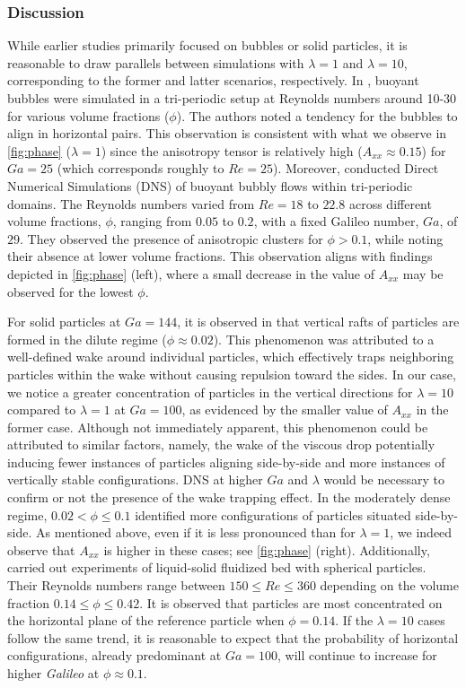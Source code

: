 \documentclass[11pt]{My_preprint}
\begin{document}
\subsubsection*{Discussion}
While earlier studies primarily focused on bubbles or solid particles, it is reasonable to draw parallels between simulations with $\lambda = 1$ and $\lambda = 10$, corresponding to the former and latter scenarios, respectively. In \citet{bunner2002dynamics}, buoyant bubbles were simulated in a tri-periodic setup at Reynolds numbers around 10-30 for various volume fractions ($\phi$). The authors noted a tendency for the bubbles to align in horizontal pairs. This observation is consistent with what we observe in \ref{fig:phase} ($\lambda = 1$) since the anisotropy tensor is relatively high ($A_{xx} \approx 0.15$) for $Ga = 25$ (which corresponds roughly to $Re = 25$). 
Moreover, \citet{zhang2021direct} conducted Direct Numerical Simulations (DNS) of buoyant bubbly flows within tri-periodic domains. The Reynolds numbers varied from $Re=18$ to $22.8$ across different volume fractions, $\phi$, ranging from $0.05$ to $0.2$, with a fixed Galileo number, $Ga$, of $29$. They observed the presence of anisotropic clusters for $\phi > 0.1$, while noting their absence at lower volume fractions. This observation aligns with findings depicted in \ref{fig:phase} (left), where a small decrease in the value of $A_{xx}$ may be observed for the lowest $\phi$.

For solid particles at $Ga = 144$, it is observed in \citet{shajahan2023inertial} that vertical rafts of particles are formed in the dilute regime ($\phi \approx 0.02$). This phenomenon was attributed to a well-defined wake around individual particles, which effectively traps neighboring particles within the wake without causing repulsion toward the sides. In our case, we notice a greater concentration of particles in the vertical directions for $\lambda = 10$ compared to $\lambda = 1$ at $Ga = 100$, as evidenced by the smaller value of $A_{xx}$ in the former case. Although not immediately apparent, this phenomenon could be attributed to similar factors, namely, the wake of the viscous drop potentially inducing fewer instances of particles aligning side-by-side and more instances of vertically stable configurations. DNS at higher $Ga$ and $\lambda$ would be necessary to confirm or not the presence of the wake trapping effect. In the moderately dense regime,  $0.02 < \phi \le 0.1$  \citet{shajahan2023inertial} identified more configurations of particles situated side-by-side. 
As mentioned above, even if it is less pronounced than for $\lambda = 1$, we indeed observe that $A_{xx}$ is higher in these cases; see \ref{fig:phase} (right). 
Additionally, \citet{almeras2021statistics} carried out experiments of liquid-solid fluidized bed with spherical particles. 
Their Reynolds numbers range between $150\leq Re \leq 360$ depending on the volume fraction $0.14 \leq \phi \leq 0.42$.
It is observed that particles are most concentrated on the horizontal plane of the reference particle when $\phi = 0.14$.
If the $\lambda = 10$ cases follow the same trend, it is reasonable to expect that the probability of horizontal configurations, already predominant at $Ga =100$, will continue to increase for higher \textit{Galileo} at $\phi  \approx 0.1$.
\end{document}
